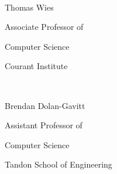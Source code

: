 {\hspace{3.2 in} \hrulefill\

\vspace{-.2 in}

\hspace{3.2 in} Thomas Wies
\vspace{-.1 in}

\hspace{3.2 in} Associate Professor of

\vspace{-.2 in}

\hspace{3.2 in} Computer Science 

\vspace{-.2 in}
\hspace{3.2 in} Courant Institute



\vspace{.2 in plus 1fill}

\hspace{3.2 in} \hrulefill\

\vspace{-.2 in}

\hspace{3.2 in} Brendan Dolan-Gavitt
\vspace{-.1 in}

\hspace{3.2 in} Assistant Professor of
\vspace{-.2 in}

\hspace{3.2 in} Computer Science

\vspace{-.2 in}
\hspace{3.2 in} Tandon School of Engineering

\vspace{0 in plus 1fill}

}
